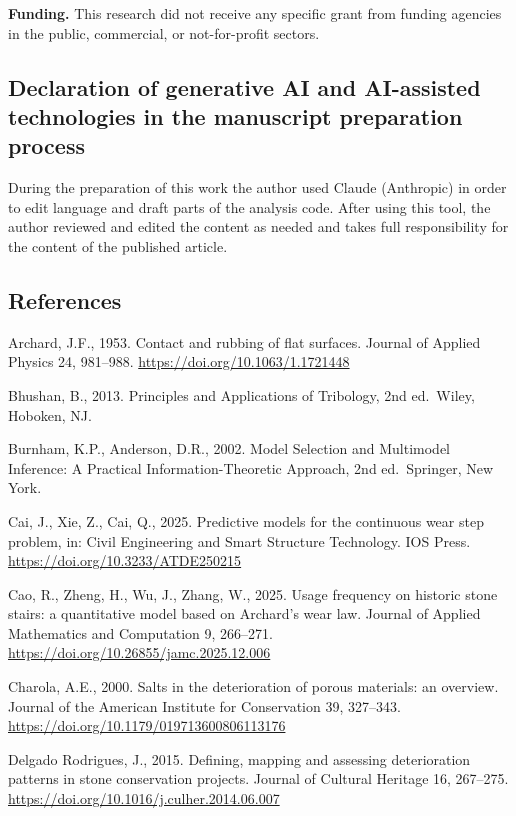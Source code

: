 \documentclass[
]{article}
\begin{document}
\textbf{Funding.} This research did not receive any specific grant from
funding agencies in the public, commercial, or not-for-profit sectors.

\subsection{Declaration of generative AI and AI-assisted technologies in
the manuscript preparation
process}\label{declaration-of-generative-ai-and-ai-assisted-technologies-in-the-manuscript-preparation-process}

During the preparation of this work the author used Claude (Anthropic)
in order to edit language and draft parts of the analysis code. After
using this tool, the author reviewed and edited the content as needed
and takes full responsibility for the content of the published article.

\subsection{References}\label{references}

Archard, J.F., 1953. Contact and rubbing of flat surfaces. Journal of
Applied Physics 24, 981--988. \url{https://doi.org/10.1063/1.1721448}

Bhushan, B., 2013. Principles and Applications of Tribology, 2nd
ed.~Wiley, Hoboken, NJ.

Burnham, K.P., Anderson, D.R., 2002. Model Selection and Multimodel
Inference: A Practical Information-Theoretic Approach, 2nd ed.~Springer,
New York.

Cai, J., Xie, Z., Cai, Q., 2025. Predictive models for the continuous
wear step problem, in: Civil Engineering and Smart Structure Technology.
IOS Press. \url{https://doi.org/10.3233/ATDE250215}

Cao, R., Zheng, H., Wu, J., Zhang, W., 2025. Usage frequency on historic
stone stairs: a quantitative model based on Archard's wear law. Journal
of Applied Mathematics and Computation 9, 266--271.
\url{https://doi.org/10.26855/jamc.2025.12.006}

Charola, A.E., 2000. Salts in the deterioration of porous materials: an
overview. Journal of the American Institute for Conservation 39,
327--343. \url{https://doi.org/10.1179/019713600806113176}

Delgado Rodrigues, J., 2015. Defining, mapping and assessing
deterioration patterns in stone conservation projects. Journal of
Cultural Heritage 16, 267--275.
\url{https://doi.org/10.1016/j.culher.2014.06.007}
\end{document}
